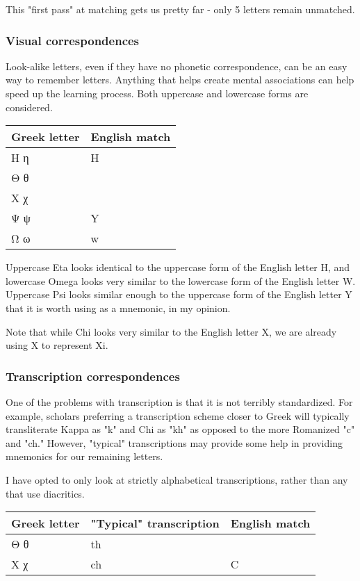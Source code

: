 \documentclass[11pt]{article}
\begin{document}
This "first pass" at matching gets us pretty far - only 5 letters remain unmatched.

\subsubsection{Visual correspondences}
\label{sec:orge1789ed}

Look-alike letters, even if they have no phonetic correspondence, can be an easy way to remember letters. Anything that helps create mental associations can help speed up the learning process. Both uppercase and lowercase forms are considered.

\begin{center}
\begin{tabular}{ll}
Greek letter & English match\\
\hline
Η η & H\\
Θ θ & \\
Χ χ & \\
Ψ ψ & Y\\
Ω ω & w\\
\end{tabular}
\end{center}

Uppercase Eta looks identical to the uppercase form of the English letter H, and lowercase Omega looks very similar to the lowercase form of the English letter W. Uppercase Psi looks similar enough to the uppercase form of the English letter Y that it is worth using as a mnemonic, in my opinion.

Note that while Chi looks very similar to the English letter X, we are already using X to represent Xi.

\subsubsection{Transcription correspondences}
\label{sec:orgcb809c8}

One of the problems with transcription is that it is not terribly standardized. For example, scholars preferring a transcription scheme closer to Greek will typically transliterate Kappa as "k" and Chi as "kh" as opposed to the more Romanized "c" and "ch." However, "typical" transcriptions may provide some help in providing mnemonics for our remaining letters.

I have opted to only look at strictly alphabetical transcriptions, rather than any that use diacritics. 

\begin{center}
\begin{tabular}{lll}
Greek letter & "Typical" transcription & English match\\
\hline
Θ θ & th & \\
Χ χ & ch & C\\
\end{tabular}
\end{center}
\end{document}

